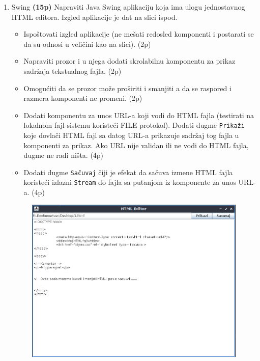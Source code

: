 \documentclass[]{article}
\begin{document}
\begin{enumerate}
  \item Swing \textbf{(15p)}
  Napraviti Java Swing aplikaciju koja ima ulogu jednostavnog HTML editora. Izgled aplikacije je dat na slici ispod.
  \begin{itemize}
    \item Ispo\v{s}tovati izgled aplikacije (ne me\v{s}ati redosled komponenti i postarati se da su odnosi u veli\v{c}ini kao na slici). \hfill (2p)
    \item Napraviti prozor i u njega dodati skrolabilnu komponentu za prikaz sadr\v{z}aja tekstualnog fajla. \hfill (2p)
    \item Omogu\'c{}iti da se prozor mo\v{z}e pro\v{s}iriti i smanjiti a da se raspored i razmera komponenti ne promeni. \hfill (2p)
    \item Dodati komponentu za unos URL-a koji vodi do HTML fajla (testirati na lokalnom fajl-sistemu koriste\'c{}i FILE protokol). Dodati dugme \texttt{Prika\v{z}i} koje dovla\v{c}i HTML fajl sa datog URL-a prikazuje sadr\v{z}aj tog fajla u komponenti za prikaz. Ako URL nije validan ili ne vodi do HTML fajla, dugme ne radi ni\v{s}ta. \hfill (4p)
    \item Dodati dugme \texttt{Sa\v{c}uvaj} \v{c}iji je efekat da sa\v{c}uva izmene HTML fajla koriste\'c{}i izlazni \texttt{Stream} do fajla sa putanjom iz komponente za unos URL-a. \hfill (4p)
  \end{itemize}

  \begin{figure}[H]
    \centering
    \includegraphics[scale=0.6]{fig.PNG}
    \label{fig2}
  \end{figure}
\end{enumerate}
\end{document}
